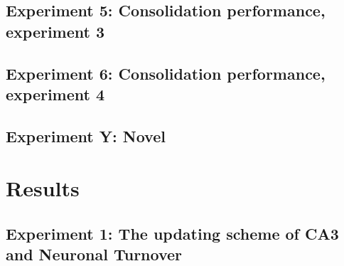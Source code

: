 \subsection{Experiment 5: Consolidation performance, experiment 3}
\subsection{Experiment 6: Consolidation performance, experiment 4}

\subsection{Experiment Y: Novel}


\section{Results}

\subsection{Experiment 1: The updating scheme of CA3 and Neuronal Turnover}





